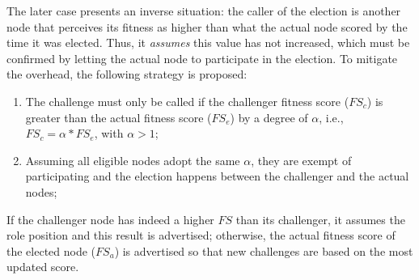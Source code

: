 The later case presents an inverse situation: the caller of the election is another node that perceives its fitness as higher than what the actual node scored by the time it was elected. Thus, it \textit{assumes} this value has not increased, which must be confirmed by letting the actual node to participate in the election. To mitigate the overhead, the following strategy is proposed:

\begin{enumerate}

\item The challenge must only be called if the challenger fitness score ($FS_c$) is greater than the actual fitness score ($FS_e$) by a degree of $\alpha$, i.e., $FS_c = \alpha * FS_e$, with $\alpha > 1$;

\item Assuming all eligible nodes adopt the same $\alpha$, they are exempt of participating and the election happens between the challenger and the actual nodes;

\end{enumerate}

If the challenger node has indeed a higher $FS$ than its challenger, it assumes the role position and this result is advertised; otherwise, the actual fitness score of the elected node ($FS_a$) is advertised so that new challenges are based on the most updated score.






%


